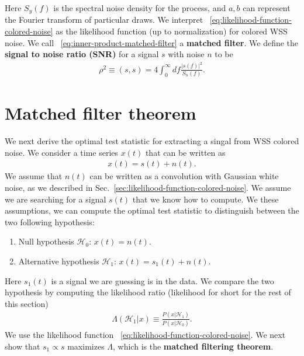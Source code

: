 Here $S_y\left(f\right)$ is the spectral noise density for the process,
and $a,b$ can represent the Fourier transform of particular draws.
We interpret ~\eqref{eq:likelihood-function-colored-noise} as the likelihood
function (up to normalization) for colored WSS noise.
We call ~\eqref{eq:inner-product-matched-filter} a \textbf{matched filter}.
We define the \textbf{signal to noise ratio (SNR)} for a signal $s$ with noise $n$ to be 
\begin{align}
    \rho^2
    \equiv
    \left(s,s\right)
    =
    4 \int_0^{\infty}df
        \frac{
            \left|s\left(f\right)\right|^2
        }{
            S_n\left(f\right)
        }
    .
\end{align}

\section{Matched filter theorem}

We next derive the optimal test statistic for extracting a singal from
WSS colored noise.
We consider a time series $x(t)$ that can be written as
\begin{align}
    x\left(t\right) = s\left(t\right) + n\left(t\right)
    .
\end{align}
We assume that $n(t)$ can be written as a convolution with Gaussian
white noise, as we described in Sec.~\eqref{sec:likelihood-function-colored-noise}.
We assume we are searching for a signal $s\left(t\right)$ that we know how
to compute. 
We these assumptions, we can compute the optimal test statistic to 
distinguish between the two following hypothesis:
\begin{enumerate}
    \item[] Null hypothesis $\mathcal{H}_0$: $x\left(t\right) = n\left(t\right)$.
    \item[] Alternative hypothesis $\mathcal{H}_1$: $x\left(t\right) = s_1\left(t\right) + n\left(t\right)$.
\end{enumerate}
Here $s_1\left(t\right)$ is a signal we are guessing is in the data.
We compare the two hypothesis by computing the likelihood ratio
(likelihood for short for the rest of this section)
\begin{align}
    \Lambda\left(\mathcal{H}_1|x\right)
    \equiv
    \frac{P\left(x|\mathcal{H}_1\right)}{P\left(x|\mathcal{H}_0\right)}
    .
\end{align}
We use the likelihood function ~\eqref{eq:likelihood-function-colored-noise}.
We next show that $s_1\propto s$ maximizes $\Lambda$, which is the \textbf{matched filtering theorem}.

